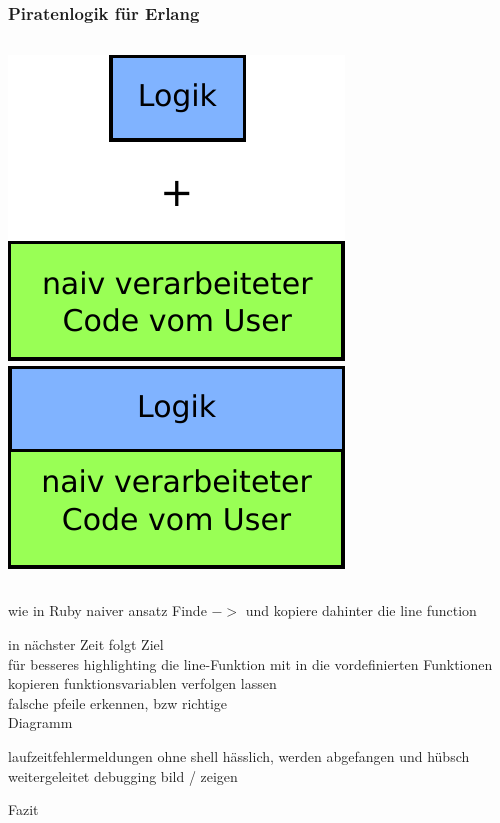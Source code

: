 \begin{frame}
\frametitle{Piratenlogik für Erlang}
\begin{columns}
  \includegraphics[scale=0.5]{erlang/pics/ErlangVerarbeitung}
    \includegraphics[scale=0.5]{erlang/pics/ErlangVerarbeitungB}
\end{columns}
wie in Ruby 
naiver ansatz 
Finde $->$ und kopiere dahinter die line function

in nächster Zeit folgt
Ziel\\
für besseres highlighting die line-Funktion mit in die vordefinierten Funktionen kopieren
funktionsvariablen verfolgen lassen\\
falsche pfeile erkennen, bzw richtige\\
Diagramm
\end{frame}

\begin{frame}
laufzeitfehlermeldungen ohne shell hässlich, werden abgefangen und hübsch weitergeleitet
debugging bild / zeigen
\end{frame}

\begin{frame}
\begin{center}
\LARGE Fazit
\end{center}
\end{frame}
